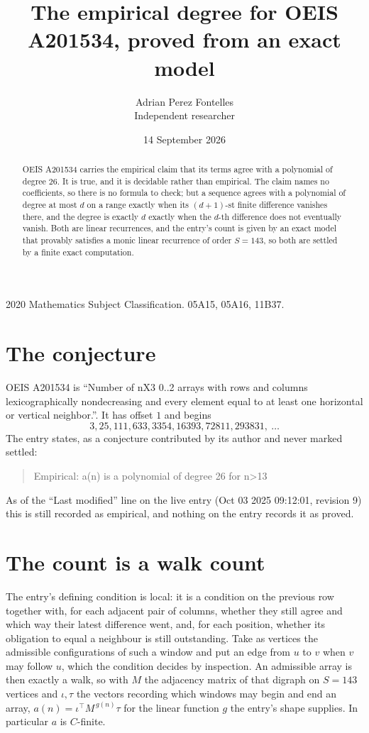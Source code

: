 \documentclass[11pt,a4paper]{article}
\title{The empirical degree for OEIS A201534, proved from an exact model}
\author{Adrian Perez Fontelles\\ \small Independent researcher}
\date{14 September 2026}
\theoremstyle{plain}
\theoremstyle{definition}
\begin{document}
\maketitle

\begin{abstract}
OEIS A201534 carries the empirical claim that its terms agree with a polynomial of degree $26$.
It is true, and it is decidable rather than empirical. The claim names no coefficients, so
there is no formula to check; but a sequence agrees with a polynomial of degree at most $d$ on
a range exactly when its $(d+1)$-st finite difference vanishes there, and the degree is exactly
$d$ exactly when the $d$-th difference does not eventually vanish. Both are linear recurrences,
and the entry's count is given by an exact model that provably satisfies a monic linear
recurrence of order $S=143$, so both are settled by a finite exact computation.
\end{abstract}

\noindent\small 2020 Mathematics Subject Classification. 05A15, 05A16, 11B37.\normalsize

\section{The conjecture}

OEIS A201534 is ``Number of nX3 0..2 arrays with rows and columns lexicographically nondecreasing and every element equal to at least one horizontal or vertical neighbor.''. It has offset $1$ and begins
\[
3, 25, 111, 633, 3354, 16393, 72811, 293831,\ \dots
\]
The entry states, as a conjecture contributed by its author and never marked settled:
\begin{quote}
Empirical: a(n) is a polynomial of degree 26 for n>13
\end{quote}
As of the ``Last modified'' line on the live entry (Oct 03 2025 09:12:01, revision 9)
this is still recorded as empirical, and nothing on the entry records it as proved.

\section{The count is a walk count}

The entry's defining condition is local: it is a condition on the previous row together with, for each adjacent pair of columns, whether they still agree and which way their latest difference went, and, for each position, whether its obligation to equal a neighbour is still outstanding. Take as vertices the
admissible configurations of such a window and put an edge from $u$ to $v$ when $v$ may follow
$u$, which the condition decides by inspection. An admissible array is then exactly a walk, so
with $M$ the adjacency matrix of that digraph on $S=143$ vertices and $\iota,\tau$ the vectors
recording which windows may begin and end an array, $a(n)=\iota^{\!\top}M^{\,g(n)}\tau$ for
the linear function $g$ the entry's shape supplies. In particular $a$ is $C$-finite.
\end{document}
